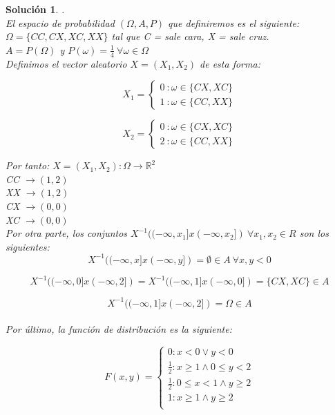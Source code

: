 \documentclass[11pt, a4paper]{article}
\newif\IfInSansMode
\newcommand{\R}{\mathbb{R}} \newcommand{\N}{\mathbb{N}}
\theoremstyle{theorem-style}
\theoremstyle{definition-style}
\theoremstyle{remark-style}
\newtheorem*{sol}{Solución}
\theoremstyle{example-style}
\begin{document}
\begin{sol}.
\\ El espacio de probabilidad $(\Omega,A,P)$ que definiremos es el siguiente: \\
$\Omega = \{CC,CX,XC,XX\}$ tal que C = sale cara, X = sale cruz.\\
$A = P(\Omega)$ y $P(\omega) = \frac{1}{4} \ \forall \omega \in \Omega$ \\

Definimos el vector aleatorio $X=(X_1,X_2)$ de esta forma:

\begin{equation}
X_1 = \left\lbrace
\begin{array}{ll}
0 \ : \omega \in \{CX,XC\} \\
1 \ : \omega \in \{CC,XX\}
\end{array}
\right.
\end{equation}

\begin{equation}
X_2 = \left\lbrace
\begin{array}{ll}
0 \ : \omega \in \{CX,XC\} \\
2 \ : \omega \in \{CC,XX\}
\end{array}
\right.
\end{equation}

Por tanto: $X = (X_1,X_2): \Omega \to \R^2$ \\
CC $ \to (1,2)$ \\
XX $ \to (1,2)$ \\
CX $ \to (0,0)$ \\
XC $ \to (0,0)$ \\

Por otra parte, los conjuntos $X^{-1}((-\infty,x_1]x(-\infty,x_2]) \ \forall x_1,x_2 \in R$ son los siguientes: \\
$$X^{-1}((-\infty,x]x(-\infty,y]) = \emptyset \in A \ \forall x,y < 0$$

$$X^{-1}((-\infty,0]x(-\infty,2]) = X^{-1}((-\infty,1]x(-\infty,0]) = \{CX,XC\} \in A $$

$$X^{-1}((-\infty,1]x(-\infty,2]) = \Omega \in A $$ \\

Por último, la función de distribución es la siguiente:

\begin{equation}
F(x,y) = \left\lbrace
\begin{array}{ll}
0 : x < 0 \lor y < 0\\
\frac{1}{2} : x \ge 1 \land 0 \le y < 2\\
\frac{1}{2} : 0 \le x < 1 \land y \ge 2 \\
1 : x \ge 1 \land y \ge 2 \\
\end{array}
\right.
\end{equation}

\end{sol}
\end{document}
